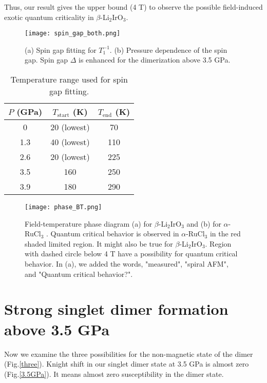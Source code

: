 Thus, our result gives the upper bound (4 T) to observe the possible field-induced exotic quantum criticality in $\beta$-Li$_2$IrO$_3$.

\begin{figure}
  \centering
  \texttt{[image: spin\_gap\_both.png]}
  \caption{(a) Spin gap fitting for $T^{-1}_1$.
  (b) Pressure dependence of the spin gap.
  Spin gap $\Delta$ is enhanced for the dimerization above 3.5 GPa.}
  \label{spin_gap}
\end{figure}

\begin{table}[H]
\begin{center}
\caption{Temperature range used for spin gap fitting.}
\begin{tabular}{ccc} \hline
 $P$ (GPa)& $T_\mathrm{start}$ (K)& $T_\mathrm{end}$ (K)\\ \hline
 0 & 20 (lowest)& 70\\ \hline
 1.3& 40 (lowest)& 110\\ \hline
 2.6& 20 (lowest)& 225\\ \hline
 3.5& 160& 250\\ \hline
 3.9& 180& 290\\ \hline
\end{tabular}
\label{Trange}
\end{center}
\end{table}

\begin{figure}
  \centering
  \texttt{[image: phase\_BT.png]}
  \caption{Field-temperature phase diagram (a) for $\beta$-Li$_2$IrO$_3$ \cite{ruiz2017correlated}
  and (b) for $\alpha$-RuCl$_3$ \cite{kasahara2018majorana}.
  Quantum critical behavior is observed in $\alpha$-RuCl$_3$ in the red shaded limited region.
  It might also be true for $\beta$-Li$_2$IrO$_3$.
  Region with dashed circle below 4 T have a possibility for quantum critical behavior.
  In (a), we added the words, "measured", "spiral AFM", and "Quantum critical behavior?".}
  \label{phase_BT}
\end{figure}

\section{Strong singlet dimer formation above 3.5 GPa}
Now we examine the three possibilities for the non-magnetic state of the dimer (Fig.\ref{three}).
Knight shift in our singlet dimer state at 3.5 GPa is almost zero (Fig.\ref{3.5GPa}).
It means almost zero susceptibility in the dimer state.

